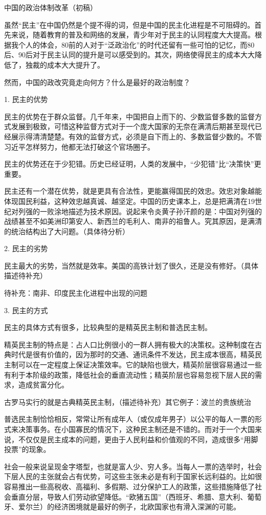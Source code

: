 中国的政治体制改革（初稿）

虽然“民主”在中国仍然是个提不得的词，但是中国的民主化进程是不可阻碍的。首先来说，随着教育的普及和网络的发展，青少年对于民主的认同程度大大提高。根据我个人的体会，80前的人对于“泛政治化”的时代还留有一些可怕的记忆，而80后、90后对于民主认同的提升是可以感受到的。其次，网络使得民主的成本大大降低了，独裁的成本大大提升了。

然而，中国的政改究竟走向何方？什么是最好的政治制度？

1. 民主的优势

民主的优势在于群众监督。几千年来，中国把自上而下的、少数监督多数的监督方式发展到极致，可惜这种监督方式对于一个庞大国家的无奈在满清后期甚至现代已经展示得清清楚楚。有效的监督方式，必须是自下而上的、多数监督少数的。不管习近平怎样努力，他都无法打破这个官场圈子。

民主的优势还在于少犯错。历史已经证明，人类的发展中，“少犯错”比“决策快”更重要。

民主还有一个潜在优势，就是更具有合法性，更能赢得国民的效忠。效忠对象越能体现国民利益，这种效忠越真诚、越坚定。中国的历史课本上，总是把满清在19世纪对列强的一败涂地描述为技术原因。说起来令炎黄子孙汗颜的是：中国对列强的战绩甚至不如美洲印第安人、新西兰的毛利人、南非的祖鲁人。究其原因，是满清的统治结构出了大问题。（具体待分析）

2. 民主的劣势

民主最大的劣势，当然就是效率。美国的高铁计划了很久，还是没有修好。（具体描述待补充）

待补充：南非、印度民主化进程中出现的问题

3. 民主的方式

民主的具体方式有很多，比较典型的是精英民主制和普选民主制。

精英民主制的特点是：占人口比例很小的一群人拥有极大的决策权。这种制度在古典时代是很有价值的，因为那时的交通、通讯条件不发达，民主成本很高，精英民主制可以在一定程度上保证决策效率。它的缺陷也很大，精英阶层很容易通过一些有利于本阶级的政策，降低社会的垂直流动性；精英阶层也容易忽视下层人民的需求，造成贫富分化。

古罗马实行的就是古典精英民主制，（描述待补充）其它例子：波兰的贵族统治

普选民主制恰恰相反，常常让所有成年人（或仅成年男子）以公平的每人一票的形式来决策事务。在小国寡民的情况下，这种民主制还是不错的。而对于一个大国来说，不仅仅是民主成本的问题，更由于人民利益和价值观的不同，造成很多“用脚投票”的现象。

社会一般来说呈现金字塔型，也就是富人少、穷人多。当每人一票的选举时，社会下层人民的主张就会占有优势，可这些主张未必是有利于国家长远利益的。比如很容易推出一些高税收、高福利、多假期、过分保护工人的政策，这些措施降低了社会垂直分层，导致人们劳动欲望降低。“欧猪五国”（西班牙、希腊、意大利、葡萄牙、爱尔兰）的经济困境就是最好的例子，北欧国家也有滑入深渊的可能。

